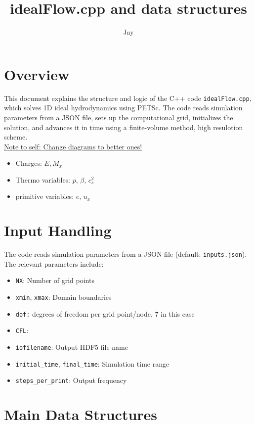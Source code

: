 \documentclass[11pt]{article}
\title{idealFlow.cpp and data structures}
\author{Jay}
\date{}
\begin{document}
\maketitle

\section{Overview}
This document explains the structure and logic of the C++ code \texttt{idealFlow.cpp}, which solves 1D ideal hydrodynamics using PETSc. The code reads simulation parameters from a JSON file, sets up the computational grid, initializes the solution, and advances it in time using a finite-volume method, high resulotion scheme.\\

\underline{Note to self: Change diagrams to better ones!}

\begin{itemize}
    \item Charges: $E, M_{x}$
    \item Thermo variables: $p, \, \beta, \, c^2_{s}$
    \item primitive variables: $e,\, u_{x}$
\end{itemize}

\section{Input Handling}
The code reads simulation parameters from a JSON file (default: \texttt{inputs.json}). The relevant parameters include:
\begin{itemize}
    \item \texttt{NX}: Number of grid points
    \item \texttt{xmin}, \texttt{xmax}: Domain boundaries
    \item \texttt{dof:} degrees of freedom per grid point/node, 7 in this case
    \item \texttt{CFL}:
    \item \texttt{iofilename}: Output HDF5 file name
    \item \texttt{initial\_time}, \texttt{final\_time}: Simulation time range
    \item \texttt{steps\_per\_print}: Output frequency
\end{itemize}

\section{Main Data Structures}
\end{document}
